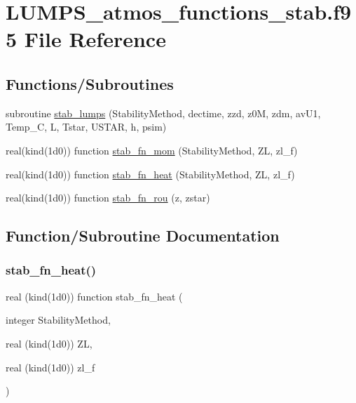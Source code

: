 \hypertarget{_l_u_m_p_s__atmos__functions__stab_8f95}{}\section{L\+U\+M\+P\+S\+\_\+atmos\+\_\+functions\+\_\+stab.\+f95 File Reference}
\label{_l_u_m_p_s__atmos__functions__stab_8f95}
\subsection*{Functions/\+Subroutines}
\begin{DoxyCompactItemize}
\item 
subroutine \hyperlink{_l_u_m_p_s__atmos__functions__stab_8f95_a1783dde883ce9c28084bad6ce0af4b7d}{stab\+\_\+lumps} (Stability\+Method, dectime, zzd, z0M, zdm, av\+U1, Temp\+\_\+C, L, Tstar, U\+S\+T\+AR, h, psim)
\item 
real(kind(1d0)) function \hyperlink{_l_u_m_p_s__atmos__functions__stab_8f95_a4747157b11ced3df83f22e214a254047}{stab\+\_\+fn\+\_\+mom} (Stability\+Method, ZL, zl\+\_\+f)
\item 
real(kind(1d0)) function \hyperlink{_l_u_m_p_s__atmos__functions__stab_8f95_a1a003755868a85b5befce4b5fb537bf6}{stab\+\_\+fn\+\_\+heat} (Stability\+Method, ZL, zl\+\_\+f)
\item 
real(kind(1d0)) function \hyperlink{_l_u_m_p_s__atmos__functions__stab_8f95_a0fea4a2d8a629eb786f16e661f9973a6}{stab\+\_\+fn\+\_\+rou} (z, zstar)
\end{DoxyCompactItemize}


\subsection{Function/\+Subroutine Documentation}
\mbox{\label{_l_u_m_p_s__atmos__functions__stab_8f95_a1a003755868a85b5befce4b5fb537bf6}} 
\subsubsection{\texorpdfstring{stab\+\_\+fn\+\_\+heat()}{stab\_fn\_heat()}}
{\footnotesize\ttfamily real (kind(1d0)) function stab\+\_\+fn\+\_\+heat (\begin{DoxyParamCaption}\item[{integer}]{Stability\+Method,  }\item[{real (kind(1d0))}]{ZL,  }\item[{real (kind(1d0))}]{zl\+\_\+f }\end{DoxyParamCaption})}



